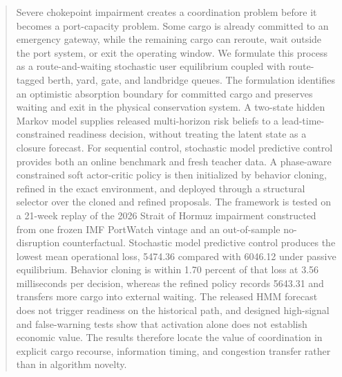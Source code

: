 \documentclass[a4paper,fleqn]{cas-sc}
\begin{document}
\begin{abstract}
Severe chokepoint impairment creates a coordination problem before it becomes a
port-capacity problem. Some cargo is already committed to an emergency gateway,
while the remaining cargo can reroute, wait outside the port system, or exit the
operating window. We formulate this process as a route-and-waiting stochastic
user equilibrium coupled with route-tagged berth, yard, gate, and landbridge
queues. The formulation identifies an optimistic absorption boundary for
committed cargo and preserves waiting and exit in the physical conservation
system. A two-state hidden Markov model supplies released multi-horizon risk
beliefs to a lead-time-constrained readiness decision, without treating the
latent state as a closure forecast. For sequential control, stochastic model
predictive control provides both an online benchmark and fresh teacher data. A
phase-aware constrained soft actor-critic policy is then initialized by behavior
cloning, refined in the exact environment, and deployed through a structural
selector over the cloned and refined proposals. The framework is tested on a
21-week replay of the 2026 Strait of Hormuz impairment constructed from one
frozen IMF PortWatch vintage and an out-of-sample no-disruption counterfactual.
Stochastic model predictive control produces the lowest mean operational loss,
5474.36 compared with 6046.12 under passive equilibrium. Behavior cloning is
within 1.70 percent of that loss at 3.56 milliseconds per decision, whereas the
refined policy records 5643.31 and transfers more cargo into external waiting.
The released HMM forecast does not trigger readiness on the historical path,
and designed high-signal and false-warning tests show that activation alone does
not establish economic value. The results therefore locate the value of
coordination in explicit cargo recourse, information timing, and congestion
transfer rather than in algorithm novelty.
\end{abstract}


\end{document}
